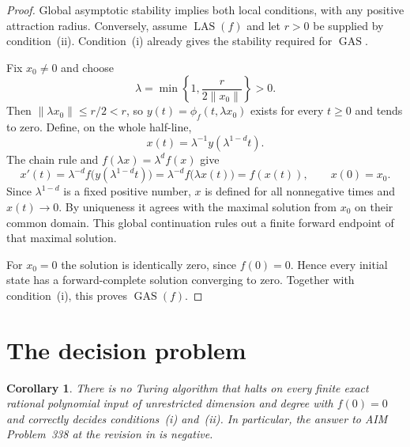 \documentclass[11pt]{article}
\newtheorem{corollary}[theorem]{Corollary}
\newcommand{\LAS}{\operatorname{LAS}}
\newcommand{\GAS}{\operatorname{GAS}}
\begin{document}
\begin{proof}
Global asymptotic stability implies both local conditions, with any positive
attraction radius. Conversely, assume $\LAS(f)$ and let $r>0$ be supplied by
condition~(ii). Condition~(i) already gives the stability required for $\GAS$.

Fix $x_0\ne0$ and choose
\[
  \lambda=\min\left\{1,\frac{r}{2\|x_0\|}\right\}>0.
\]
Then $\|\lambda x_0\|\leq r/2<r$, so
$y(t)=\phi_f(t,\lambda x_0)$ exists for every $t\geq0$ and tends to zero.
Define, on the whole half-line,
\[
  x(t)=\lambda^{-1}y(\lambda^{1-d}t).
\]
The chain rule and $f(\lambda x)=\lambda^d f(x)$ give
\[
  x'(t)=\lambda^{-d}f\bigl(y(\lambda^{1-d}t)\bigr)
       =\lambda^{-d}f\bigl(\lambda x(t)\bigr)=f(x(t)),
  \qquad x(0)=x_0.
\]
Since $\lambda^{1-d}$ is a fixed positive number, $x$ is defined for all
nonnegative times and $x(t)\to0$. By uniqueness it agrees with the maximal
solution from $x_0$ on their common domain. This global continuation rules
out a finite forward endpoint of that maximal solution.

For $x_0=0$ the solution is identically zero, since $f(0)=0$. Hence every
initial state has a forward-complete solution converging to zero. Together
with condition~(i), this proves $\GAS(f)$.
\end{proof}

\section{The decision problem}

\begin{corollary}\label{cor:aim}
There is no Turing algorithm that halts on every finite exact rational
polynomial input of unrestricted dimension and degree with $f(0)=0$ and
correctly decides conditions~(i) and~(ii). In particular, the answer to AIM
Problem~338 at the revision in \cite{AIM338} is negative.
\end{corollary}
\end{document}
